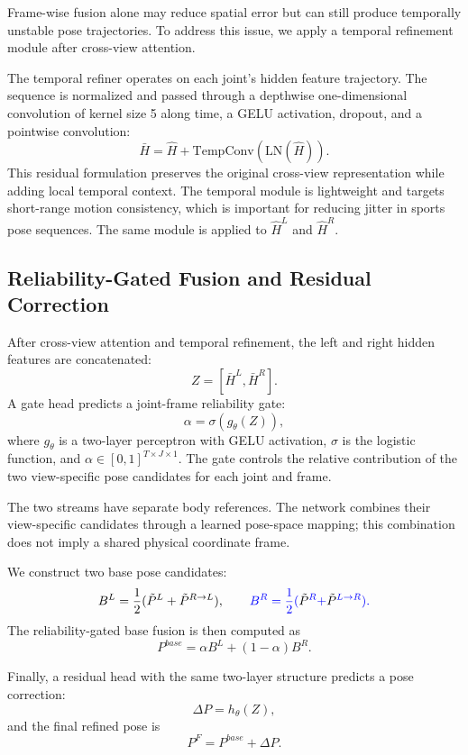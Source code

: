 \documentclass[preprint,12pt]{elsarticle}
\providecommand{\DIFaddbegin}{} %
\providecommand{\DIFaddend}{} %
\providecommand{\DIFadd}[1]{{\protect\color{blue}#1}} %
\begin{document}
Frame-wise fusion alone may reduce spatial error but can still produce temporally unstable pose trajectories. To address this issue, we apply a temporal refinement module after cross-view attention.

The temporal refiner  \DIFaddbegin \DIFadd{operates on each joint's hidden feature trajectory. The }\DIFaddend sequence is normalized and passed through a  \DIFaddbegin \DIFadd{depthwise one-dimensional convolution of kernel size 5 along time, a GELU activation, dropout, and a pointwise convolution}\DIFaddend :
\[
\bar{H} = \hat{H} + \mathrm{TempConv}(\mathrm{LN}(\hat{H})).
\]
This residual formulation preserves the original cross-view representation while adding local temporal context. The temporal module is lightweight and targets short-range motion consistency, which is important for reducing jitter in sports pose sequences. \DIFaddbegin \DIFadd{The same module is applied to \(\hat{H}^{L}\) and \(\hat{H}^{R}\).
}\DIFaddend 

\subsection{Reliability-Gated Fusion and Residual Correction}
\label{subsec:reliability_fusion}

After cross-view attention and temporal refinement, the left and right hidden features are concatenated:
\[
Z = [\bar{H}^{L}, \bar{H}^{R}].
\]
A gate head predicts a joint-frame reliability gate:
\[
\alpha = \sigma(g_{\theta}(Z)),
\]
where \DIFaddbegin \DIFadd{\(g_{\theta}\) is a two-layer perceptron with GELU activation, \(\sigma\) is the logistic function, and }\DIFaddend \(\alpha \in [0,1]^{T \times J \times 1}\). The gate controls the relative contribution of the two view-specific pose candidates for each joint and frame.

The two streams have separate body references. The network combines their view-specific candidates through a learned pose-space mapping; this combination does not imply a shared physical coordinate frame.

We construct two base pose candidates:
\[
B^{L} = \frac{1}{2}(\tilde{P}^{L} + \tilde{P}^{R \rightarrow L}),
\DIFaddbegin \DIFadd{\qquad
B^{R} = \frac{1}{2}(}\tilde{P}\DIFadd{^{R} + }\tilde{P}\DIFadd{^{L \rightarrow R}).
}\DIFaddend \]
 The reliability-gated base fusion is then computed as
\[
P^{base}
=
\alpha B^{L}
+
(1-\alpha)B^{R}.
\]

Finally, a residual head \DIFaddbegin \DIFadd{with the same two-layer structure }\DIFaddend predicts a pose correction:
\[
\Delta P = h_{\theta}(Z),
\]
and the final refined pose is
\[
P^{F} = P^{base} + \Delta P.
\]
\end{document}
